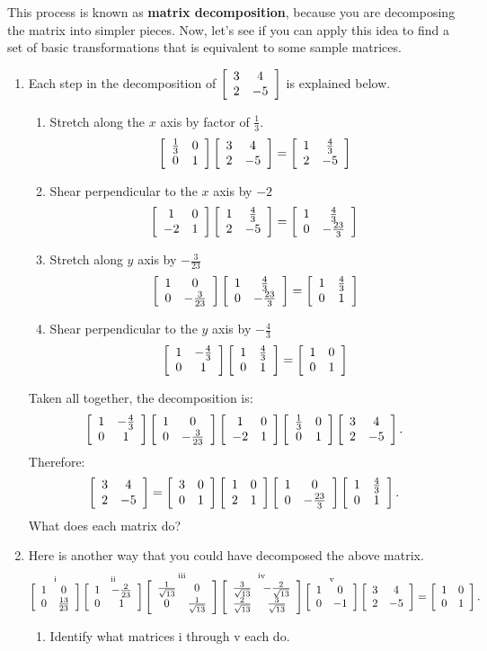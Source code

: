 \documentclass[../gatm.tex]{subfiles}
\begin{document}
This process is known as \textbf{matrix decomposition}, because you are decomposing the matrix into simpler pieces. Now, let's see if you can apply this idea to find a set of basic transformations that is equivalent to some sample matrices.

\begin{enumerate}
\setcounter{enumi}{\value{problem_i}}
\item \label{prob:needed_for_matrix_undo1}Each step in the decomposition of $\twomat{3}{4}{2}{-5}$ is explained below.
\begin{multicols}{2}
\begin{enumerate}[label=(\roman*)]
\item Stretch along the $x$ axis by factor of $\frac{1}{3}$.
$$\twomat{\frac{1}{3}}{0}{0}{1}\twomat{3}{4}{2}{-5}=\twomat{1}{\frac{4}{3}}{2}{-5}$$
\item Shear perpendicular to the $x$ axis by $-2$
$$\twomat{1}{0}{-2}{1}\twomat{1}{\frac{4}{3}}{2}{-5}=\twomat{1}{\frac{4}{3}}{0}{-\frac{23}{3}}$$
\item Stretch along $y$ axis by $-\frac{3}{23}$
$$\twomat{1}{0}{0}{-\frac{3}{23}}\twomat{1}{\frac{4}{3}}{0}{-\frac{23}{3}}=\twomat{1}{\frac{4}{3}}{0}{1}$$
\item Shear perpendicular to the $y$ axis by $-\frac{4}{3}$
$$\twomat{1}{-\frac{4}{3}}{0}{1}\twomat{1}{\frac{4}{3}}{0}{1}=\twomat{1}{0}{0}{1}$$
\end{enumerate}
\end{multicols}
Taken all together, the decomposition is:
$$\twomat{1}{-\frac{4}{3}}{0}{1}\twomat{1}{0}{0}{-\frac{3}{23}}\twomat{1}{0}{-2}{1}\twomat{\frac{1}{3}}{0}{0}{1}\twomat{3}{4}{2}{-5}.$$
Therefore: $$\twomat{3}{4}{2}{-5}=\twomat{3}{0}{0}{1}\twomat{1}{0}{2}{1}\twomat{1}{0}{0}{-\frac{23}{3}}\twomat{1}{\frac{4}{3}}{0}{1}.$$ What does each matrix do?
\item\label{prob:needed_for_matrix_undo2}Here is another way that you could have decomposed the above matrix.
\vspace{-2ex}
$$\mathop{\twomat{1}{0}{0}{\frac{13}{23}}}^{\text{i}}
\mathop{\twomat{1}{-\frac{2}{23}}{0}{1}}^{\text{ii}}
\mathop{\twomat{\frac{1}{\sqrt{13}}}{0}{0}{\frac{1}{\sqrt{13}}}}^{\text{iii}}
\mathop{\twomat{\frac{3}{\sqrt{13}}}{-\frac{2}{\sqrt{13}}}{\frac{2}{\sqrt{13}}}{\frac{3}{\sqrt{13}}}}^{\text{iv}}
\mathop{\twomat{1}{0}{0}{-1}}^{\text{v}}
\twomat{3}{4}{2}{-5}=\twomat{1}{0}{0}{1}.$$
\begin{enumerate}
\item Identify what matrices i through v each do.

\end{enumerate}
\end{enumerate}
\end{document}
